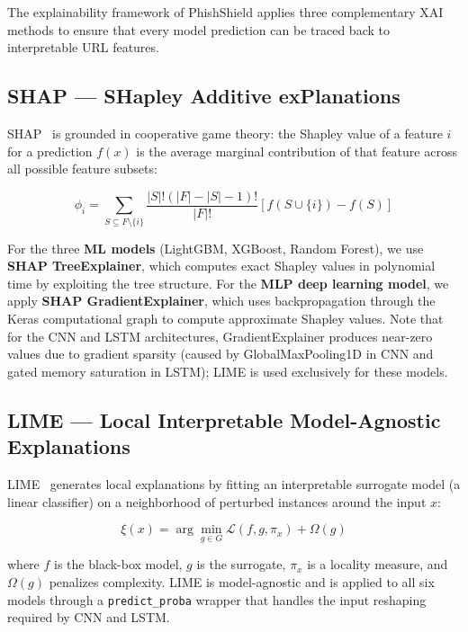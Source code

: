 The explainability framework of PhishShield applies three complementary XAI methods to ensure that every model prediction can be traced back to interpretable URL features.

\subsection{SHAP — SHapley Additive exPlanations}

SHAP~\cite{lundberg2017} is grounded in cooperative game theory: the Shapley value of a feature $i$ for a prediction $f(x)$ is the average marginal contribution of that feature across all possible feature subsets:

\begin{equation}
    \phi_i = \sum_{S \subseteq F \setminus \{i\}} \frac{|S|!(|F|-|S|-1)!}{|F|!}\left[f(S \cup \{i\}) - f(S)\right]
\end{equation}

For the three \textbf{ML models} (LightGBM, XGBoost, Random Forest), we use \textbf{SHAP TreeExplainer}, which computes exact Shapley values in polynomial time by exploiting the tree structure. For the \textbf{MLP deep learning model}, we apply \textbf{SHAP GradientExplainer}, which uses backpropagation through the Keras computational graph to compute approximate Shapley values. Note that for the CNN and LSTM architectures, GradientExplainer produces near-zero values due to gradient sparsity (caused by GlobalMaxPooling1D in CNN and gated memory saturation in LSTM); LIME is used exclusively for these models.

\subsection{LIME — Local Interpretable Model-Agnostic Explanations}

LIME~\cite{ribeiro2016} generates local explanations by fitting an interpretable surrogate model (a linear classifier) on a neighborhood of perturbed instances around the input $x$:

\begin{equation}
    \xi(x) = \arg\min_{g \in G} \mathcal{L}(f, g, \pi_x) + \Omega(g)
\end{equation}

where $f$ is the black-box model, $g$ is the surrogate, $\pi_x$ is a locality measure, and $\Omega(g)$ penalizes complexity. LIME is model-agnostic and is applied to all six models through a \texttt{predict\_proba} wrapper that handles the input reshaping required by CNN and LSTM.

